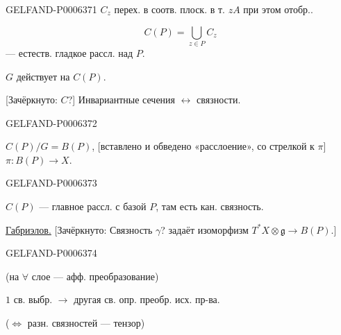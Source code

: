 \begin{GelfandAdjacentEvidence}{GELFAND-P000637}{1}
\(C_z\) перех. в соотв. плоск. в т. \(zA\) при этом отобр..

\[
C(P)=\bigcup_{z\in P}C_z
\]
--- естеств. гладкое рассл. над \(P\).

\(G\) действует на \(C(P)\).

[Зачёркнуто: \(C\)?] Инвариантные сечения \(\longleftrightarrow\) связности.
\end{GelfandAdjacentEvidence}
\begin{GelfandAdjacentEvidence}{GELFAND-P000637}{2}


\underline{\(C(P)/G=B(P)\)}, [вставлено и обведено «расслоение», со стрелкой к \(\pi\)]
\(\pi:B(P)\to X\).
\end{GelfandAdjacentEvidence}
\begin{GelfandAdjacentEvidence}{GELFAND-P000637}{3}


\(C(P)\) --- главное рассл. с базой \(P\), там есть кан. связность.

\underline{Габриэлов.}
[Зачёркнуто: Связность \(\gamma\)? задаёт изоморфизм
\(T^*X\otimes\mathfrak g\to B(P)\).]
\end{GelfandAdjacentEvidence}
\begin{GelfandAdjacentEvidence}{GELFAND-P000637}{4}


(на \(\forall\) слое --- афф. преобразование)

\(1\) св. выбр. \(\to\) другая св. опр. преобр. исх. пр-ва.

(\(\Longleftrightarrow\) разн. связностей --- тензор)

\end{GelfandAdjacentEvidence}


